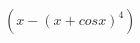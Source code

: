 \documentclass{proc}
\begin{document}
$ {( {  x  } - { {( {  x  } + {  cos {  x  } } )} ^ {  4  } } )} $
\end{document}
